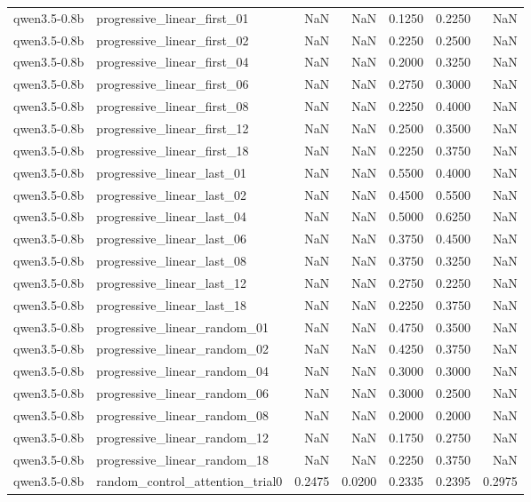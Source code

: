 \begin{tabular}{llrrrrr}
qwen3.5-0.8b & progressive_linear_first_01 & NaN & NaN & 0.1250 & 0.2250 & NaN \\
qwen3.5-0.8b & progressive_linear_first_02 & NaN & NaN & 0.2250 & 0.2500 & NaN \\
qwen3.5-0.8b & progressive_linear_first_04 & NaN & NaN & 0.2000 & 0.3250 & NaN \\
qwen3.5-0.8b & progressive_linear_first_06 & NaN & NaN & 0.2750 & 0.3000 & NaN \\
qwen3.5-0.8b & progressive_linear_first_08 & NaN & NaN & 0.2250 & 0.4000 & NaN \\
qwen3.5-0.8b & progressive_linear_first_12 & NaN & NaN & 0.2500 & 0.3500 & NaN \\
qwen3.5-0.8b & progressive_linear_first_18 & NaN & NaN & 0.2250 & 0.3750 & NaN \\
qwen3.5-0.8b & progressive_linear_last_01 & NaN & NaN & 0.5500 & 0.4000 & NaN \\
qwen3.5-0.8b & progressive_linear_last_02 & NaN & NaN & 0.4500 & 0.5500 & NaN \\
qwen3.5-0.8b & progressive_linear_last_04 & NaN & NaN & 0.5000 & 0.6250 & NaN \\
qwen3.5-0.8b & progressive_linear_last_06 & NaN & NaN & 0.3750 & 0.4500 & NaN \\
qwen3.5-0.8b & progressive_linear_last_08 & NaN & NaN & 0.3750 & 0.3250 & NaN \\
qwen3.5-0.8b & progressive_linear_last_12 & NaN & NaN & 0.2750 & 0.2250 & NaN \\
qwen3.5-0.8b & progressive_linear_last_18 & NaN & NaN & 0.2250 & 0.3750 & NaN \\
qwen3.5-0.8b & progressive_linear_random_01 & NaN & NaN & 0.4750 & 0.3500 & NaN \\
qwen3.5-0.8b & progressive_linear_random_02 & NaN & NaN & 0.4250 & 0.3750 & NaN \\
qwen3.5-0.8b & progressive_linear_random_04 & NaN & NaN & 0.3000 & 0.3000 & NaN \\
qwen3.5-0.8b & progressive_linear_random_06 & NaN & NaN & 0.3000 & 0.2500 & NaN \\
qwen3.5-0.8b & progressive_linear_random_08 & NaN & NaN & 0.2000 & 0.2000 & NaN \\
qwen3.5-0.8b & progressive_linear_random_12 & NaN & NaN & 0.1750 & 0.2750 & NaN \\
qwen3.5-0.8b & progressive_linear_random_18 & NaN & NaN & 0.2250 & 0.3750 & NaN \\
qwen3.5-0.8b & random_control_attention_trial0 & 0.2475 & 0.0200 & 0.2335 & 0.2395 & 0.2975 \\

\end{tabular}
